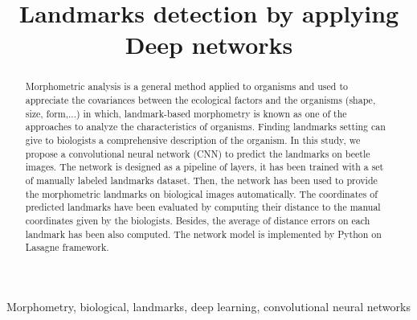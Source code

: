 \documentclass[conference]{IEEEtran}
\begin{document}
\title{Landmarks detection by applying Deep networks}
\author{
\and
{}
\and
{}
\and
{}
}
\maketitle

\begin{abstract}
Morphometric analysis is a general method applied to organisms and used to appreciate the covariances between the ecological factors and the organisms (shape, size, form,...) in which, landmark-based morphometry is known as one of the approaches to analyze the characteristics of organisms. Finding landmarks setting can give to biologists a comprehensive description of the organism. In this study, we propose a convolutional neural network (CNN) to predict the landmarks on beetle images. The network is designed as a pipeline of layers, it has been trained with a set of manually labeled landmarks dataset. Then, the network has been used to provide the morphometric landmarks on biological images automatically. The coordinates of predicted landmarks have been evaluated by computing their distance to the manual coordinates given by the biologists. Besides, the average of distance errors on each landmark has been also computed. The network model is implemented by Python on Lasagne framework.
\end{abstract}

\begin{IEEEkeywords}
Morphometry, biological, landmarks, deep learning, convolutional neural networks
\end{IEEEkeywords}
\end{document}
